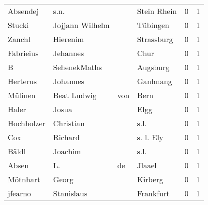 \begin{center}
\begin{tiny}
\begin{longtabu}{llllrr}
                 Absendej &                               s.n. &             &                                 Stein Rhein &          0 &         1 \\
                   Stucki &                    Jojjann Wilhelm &             &                                    Tübingen &          0 &         1 \\
                   Zanchl &                           Hierenim &             &                                  Strassburg &          0 &         1 \\
                Fabrieius &                           Jehannes &             &                                        Chur &          0 &         1 \\
                        B &                       SehenekMaths &             &                                    Augsburg &          0 &         1 \\
                 Herterus &                           Johannes &             &                                    Ganhnang &          0 &         1 \\
                  Mülinen &                        Beat Ludwig &         von &                                        Bern &          0 &         1 \\
                    Haler &                              Josua &             &                                        Elgg &          0 &         1 \\
               Hochholzer &                          Christian &             &                                        s.l. &          0 &         1 \\
                      Cox &                            Richard &             &                                   s. l. Ely &          0 &         1 \\
                    Bäldl &                            Joachim &             &                                        s.l. &          0 &         1 \\
                    Absen &                                 L. &          de &                                      Jlaael &          0 &         1 \\
                 Mötnhart &                              Georg &             &                                     Kirberg &          0 &         1 \\
                  jfearno &                         Stanislaus &             &                                   Frankfurt &          0 &         1 \\

\end{longtabu}
\end{tiny}
\end{center}
